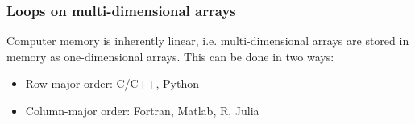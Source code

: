 \begin{frame}[fragile]
    \frametitle{Loops on multi-dimensional arrays}
    Computer memory is inherently linear, i.e. multi-dimensional arrays are stored in memory as one-dimensional arrays. This can be done in two ways:
    \begin{itemize}
        \item{Row-major order: C/C++, Python}
        \item{Column-major order: Fortran, Matlab, R, Julia}
    \end{itemize}

    \vspace{-1em}
    \begin{figure}
        \qquad

\end{figure}
\end{frame}
